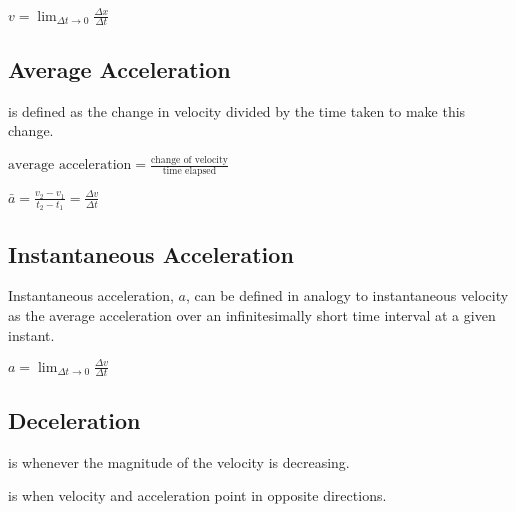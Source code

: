 \documentclass{extarticle}
\begin{document}
$v = \lim_{\Delta t \to 0} \frac{\Delta x}{\Delta t}$

\subsection{Average Acceleration}
is defined as the change in velocity divided by the time taken to make this change.

$\text{average acceleration} = \frac{\text{change of velocity}}{\text{time elapsed}}$

$\bar{a} = \frac{v_2 - v_1}{t_2 - t_1} = \frac{\Delta v}{\Delta t}$

\subsection{Instantaneous Acceleration}
Instantaneous acceleration, $a$, can be defined in analogy to instantaneous
velocity as the average acceleration over an infinitesimally short time interval at
a given instant.

$a = \lim_{\Delta t \to 0} \frac{\Delta v}{\Delta t}$



\subsection{Deceleration}
is whenever the magnitude of the velocity is decreasing.

is when velocity and acceleration point in opposite directions.
\end{document}
